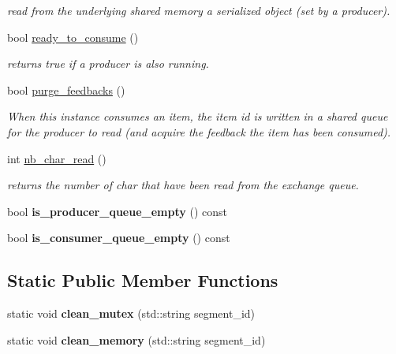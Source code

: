 \begin{DoxyCompactItemize}
\begin{DoxyCompactList}\small\item\em read from the underlying shared memory a serialized object (set by a producer). \end{DoxyCompactList}\item 
bool \hyperlink{classshared__memory_1_1Exchange__manager__consumer_af1a894d796387d297f848d18d8d55df5}{ready\+\_\+to\+\_\+consume} ()
\begin{DoxyCompactList}\small\item\em returns true if a producer is also running. \end{DoxyCompactList}\item 
bool \hyperlink{classshared__memory_1_1Exchange__manager__consumer_a5e62220c9b50327130cb95683d22b0dc}{purge\+\_\+feedbacks} ()
\begin{DoxyCompactList}\small\item\em When this instance consumes an item, the item id is written in a shared queue for the producer to read (and acquire the feedback the item has been consumed). \end{DoxyCompactList}\item 
int \hyperlink{classshared__memory_1_1Exchange__manager__consumer_ab8651cff750b5cb2ceae97a97b2c7f2d}{nb\+\_\+char\+\_\+read} ()
\begin{DoxyCompactList}\small\item\em returns the number of char that have been read from the exchange queue. \end{DoxyCompactList}\item 
\mbox{\label{classshared__memory_1_1Exchange__manager__consumer_a5c4f6ecbd5c18915923048e1c9067112}} 
bool {\bfseries is\+\_\+producer\+\_\+queue\+\_\+empty} () const
\item 
\mbox{\label{classshared__memory_1_1Exchange__manager__consumer_a1f853781c308a063f28cbfc6ecc90739}} 
bool {\bfseries is\+\_\+consumer\+\_\+queue\+\_\+empty} () const
\end{DoxyCompactItemize}
\subsection*{Static Public Member Functions}
\begin{DoxyCompactItemize}
\item 
\mbox{\label{classshared__memory_1_1Exchange__manager__consumer_a5aeebd5f2857f73c91fe3212d274909e}} 
static void {\bfseries clean\+\_\+mutex} (std\+::string segment\+\_\+id)
\item 
\mbox{\label{classshared__memory_1_1Exchange__manager__consumer_a828a56d15a0f68edd8e3b395c41b0c0c}} 
static void {\bfseries clean\+\_\+memory} (std\+::string segment\+\_\+id)
\end{DoxyCompactItemize}
